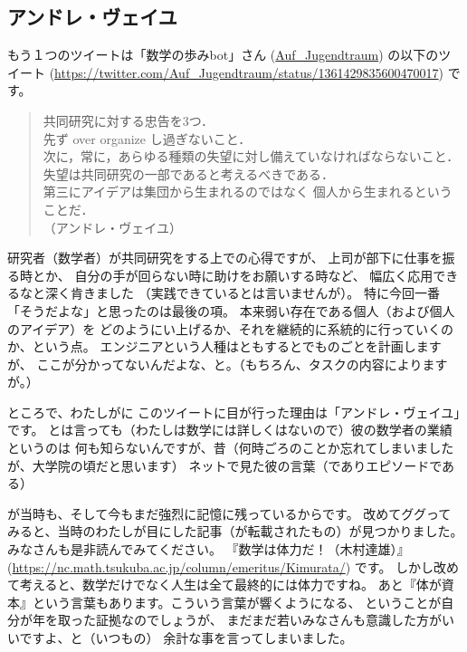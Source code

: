 \documentclass[dvipdfmx,autodetect-engine,10pt,b5paper,papersize,openany,dvipsnames]{jsbook}
\begin{document}
\begin{multicols}{2}
\subsection{アンドレ・ヴェイユ}
もう１つのツイートは「数学の歩みbot」さん
(\href{https://twitter.com/Auf_Jugendtraum}{Auf\_Jugendtraum})
の以下のツイート
(\url{https://twitter.com/Auf_Jugendtraum/status/1361429835600470017})
です。
\begin{quotation}
  \noindent
  共同研究に対する忠告を3つ．\\
  先ず over organize し過ぎないこと．\\
  次に，常に，あらゆる種類の失望に対し備えていなければならないこと．\\
  失望は共同研究の一部であると考えるべきである．\\
  第三にアイデアは集団から生まれるのではなく 個人から生まれるということだ．\\
  （アンドレ・ヴェイユ）
\end{quotation}
研究者（数学者）が共同研究をする上での心得ですが、
上司が部下に仕事を振る時とか、
自分の手が回らない時に助けをお願いする時など、
幅広く応用できるなと深く肯きました
（実践できているとは言いませんが）。
特に今回一番「そうだよな」と思ったのは最後の項。
本来弱い存在である個人（および個人のアイデア）を
どのようにい上げるか、それを継続的に系統的に行っていくのか、という点。
エンジニアという人種はともするとでものごとを計画しますが、
ここが分かってないんだよな、と。（もちろん、タスクの内容によりますが。）


ところで、わたしがに
このツイートに目が行った理由は「アンドレ・ヴェイユ」です。
とは言っても（わたしは数学には詳しくはないので）彼の数学者の業績というのは
何も知らないんですが、昔（何時ごろのことか忘れてしまいましたが、大学院の頃だと思います）
ネットで見た彼の言葉（でありエピソードである）
\begin{center}
\end{center}
が当時も、そして今もまだ強烈に記憶に残っているからです。
改めてググってみると、当時のわたしが目にした記事（が転載されたもの）が見つかりました。
みなさんも是非読んでみてください。
『数学は体力だ！（木村達雄）』
(\url{https://nc.math.tsukuba.ac.jp/column/emeritus/Kimurata/})
です。
しかし改めて考えると、数学だけでなく人生は全て最終的には体力ですね。
あと『体が資本』という言葉もあります。こういう言葉が響くようになる、
ということが自分が年を取った証拠なのでしょうが、
まだまだ若いみなさんも意識した方がいいですよ、と（いつもの）
余計な事を言ってしまいました。


\end{multicols}
\end{document}
